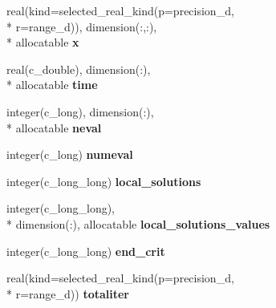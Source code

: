\begin{DoxyCompactItemize}
\item 
\hypertarget{structscattersearchtypes_1_1resultsf_a844e2e9275a3f88bd10353d50c325df0}{real(kind=selected\-\_\-real\-\_\-kind(p=precision\-\_\-d, \\*
r=range\-\_\-d)), dimension(\-:,\-:), \\*
allocatable {\bfseries x}}\label{structscattersearchtypes_1_1resultsf_a844e2e9275a3f88bd10353d50c325df0}

\item 
\hypertarget{structscattersearchtypes_1_1resultsf_ad36864ff453986f566591fb159394598}{real(c\-\_\-double), dimension(\-:), \\*
allocatable {\bfseries time}}\label{structscattersearchtypes_1_1resultsf_ad36864ff453986f566591fb159394598}

\item 
\hypertarget{structscattersearchtypes_1_1resultsf_a5071436eaa8e02ac45334cf2090ba953}{integer(c\-\_\-long), dimension(\-:), \\*
allocatable {\bfseries neval}}\label{structscattersearchtypes_1_1resultsf_a5071436eaa8e02ac45334cf2090ba953}

\item 
\hypertarget{structscattersearchtypes_1_1resultsf_ab6395f018c137d1f5fa35cffabf07e33}{integer(c\-\_\-long) {\bfseries numeval}}\label{structscattersearchtypes_1_1resultsf_ab6395f018c137d1f5fa35cffabf07e33}

\item 
\hypertarget{structscattersearchtypes_1_1resultsf_aae233636f1d532c4bccb3b03b0cdde2b}{integer(c\-\_\-long\-\_\-long) {\bfseries local\-\_\-solutions}}\label{structscattersearchtypes_1_1resultsf_aae233636f1d532c4bccb3b03b0cdde2b}

\item 
\hypertarget{structscattersearchtypes_1_1resultsf_a1ed9b08113fcdeca4329864f1071ea97}{integer(c\-\_\-long\-\_\-long), \\*
dimension(\-:), allocatable {\bfseries local\-\_\-solutions\-\_\-values}}\label{structscattersearchtypes_1_1resultsf_a1ed9b08113fcdeca4329864f1071ea97}

\item 
\hypertarget{structscattersearchtypes_1_1resultsf_aaa3e5e284965faf74e97c568eb1d844f}{integer(c\-\_\-long\-\_\-long) {\bfseries end\-\_\-crit}}\label{structscattersearchtypes_1_1resultsf_aaa3e5e284965faf74e97c568eb1d844f}

\item 
\hypertarget{structscattersearchtypes_1_1resultsf_ad86dac34418ca522ce67907f0cf8d789}{real(kind=selected\-\_\-real\-\_\-kind(p=precision\-\_\-d, \\*
r=range\-\_\-d)) {\bfseries totaliter}}\label{structscattersearchtypes_1_1resultsf_ad86dac34418ca522ce67907f0cf8d789}


\end{DoxyCompactItemize}
